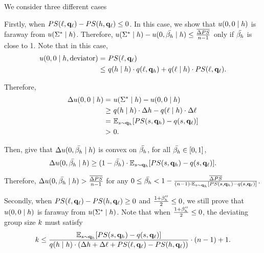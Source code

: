 We consider three different cases

Firstly, when $PS(\ell, \mathbf{q}_{\ell}) - PS(h, \mathbf{q}_\ell) \le 0$. In this case, we show that $u(0, 0 \mid h)$ is faraway from $u(\Sigma^*\mid h)$. Therefore, $u(\Sigma^* \mid h) - u(0, \bar{\beta_{h}} \mid h) \le \frac{\overline{\Delta PS}}{n - 1}$ only if $\bar{\beta_{h}}$ is close to 1. Note that in this case, 
\begin{align*}
    u(0, 0\mid h, \text{deviator}) = &\ PS(\ell, \mathbf{q}_\ell)\\
    \le &\ q(h\mid h) \cdot q(\ell, \mathbf{q}_h) + q(\ell\mid h) \cdot PS(\ell, \mathbf{q}_\ell). 
\end{align*}

Therefore, 
\begin{align*}
    \Delta u(0, 0 \mid h) = &\ u(\Sigma^* \mid h) - u(0, 0\mid h)\\
    \ge &\ q(h\mid h) \cdot \Delta h - q(\ell\mid h) \cdot \Delta \ell\\
    =&\ \mathbb{E}_{s \sim \mathbf{q}_h}[PS(s, \mathbf{q}_h) - q(s, \mathbf{q}_\ell)]\\
    > &\ 0. 
\end{align*}

Then, give that $\Delta u(0, \bar{\beta_{h}} \mid h)$ is convex on $\bar{\beta_{h}}$, for all $\bar{\beta_{h}} \in [0, 1]$, 
$$\Delta u(0, \bar{\beta_{h}} \mid h) \ge (1 - \bar{\beta_{h}}) \cdot \mathbb{E}_{s \sim \mathbf{q}_h}[PS(s, \mathbf{q}_h) - q(s, \mathbf{q}_\ell)]. $$

Therefore, $\Delta u(0, \bar{\beta_{h}} \mid h) > \frac{\overline{\Delta PS}}{ n - 1}$ for any $0 \le  \bar{\beta_{h}} < 1 - \frac{\overline{\Delta PS}}{ (n - 1)\cdot \mathbb{E}_{s \sim \mathbf{q}_h}[PS(s, \mathbf{q}_h) - q(s, \mathbf{q}_\ell)]}$. 

Secondly, when $PS(\ell, \mathbf{q}_{\ell}) - PS(h, \mathbf{q}_\ell) \ge 0$ and $\frac{1 + \beta_{h}''}{2} \le 0$, we still prove that $u(0, 0 \mid h)$ is faraway from $u(\Sigma^*\mid h)$. Note that when $\frac{1 + \beta_{h}''}{2} \le 0$, the deviating group size $k$ must satisfy
\begin{equation*}
    k \le \frac{\mathbb{E}_{s \sim \mathbf{q}_h}[PS(s, \mathbf{q}_h) - q(s, \mathbf{q}_\ell)]}{q(h\mid h) \cdot (\Delta h + \Delta \ell + PS(\ell, \mathbf{q}_{\ell}) - PS(h, \mathbf{q}_\ell))}\cdot (n-1) + 1. 
\end{equation*}


